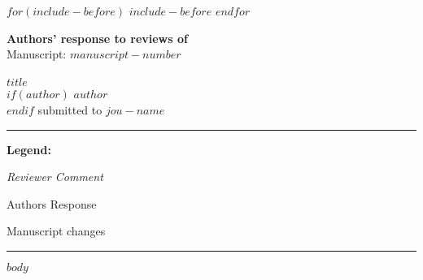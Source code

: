\documentclass[a4paper]{article}
\begin{document}
$for(include-before)$
$include-before$
$endfor$

{\Large\bf Authors' response to reviews of}\\[1em]
Manuscript: $manuscript-number$\\ \\
{\large $title$}\\[1em]
$if(author)$
{$author$}\\[1em]
$endif$
{submitted to \it $jou-name$ }\\
\hrule
\vspace{2em}

\textbf{Legend:}

\begin{minipage}[t]{0.33\textwidth}
    \begin{tcolorbox}[colback=black!0,boxrule=0pt,sharp corners, colframe=white]
        \textit{Reviewer Comment}
    \end{tcolorbox}
\end{minipage}
\begin{minipage}[t]{0.33\textwidth}
    \begin{tcolorbox}[colback=white,boxrule=0pt,sharp corners, colframe=white]
        \color{colResponse}
        Authors Response
    \end{tcolorbox}
\end{minipage}
\begin{minipage}[t]{0.33\textwidth}
  \begin{tcolorbox}[colback=black!10,boxrule=0pt,sharp corners, colframe=white]
        Manuscript changes
  \end{tcolorbox}
\end{minipage}

\vspace{2em}
\hrule
\vspace{2em}


\color{colResponse}

$body$

\color{black}
\end{document}
